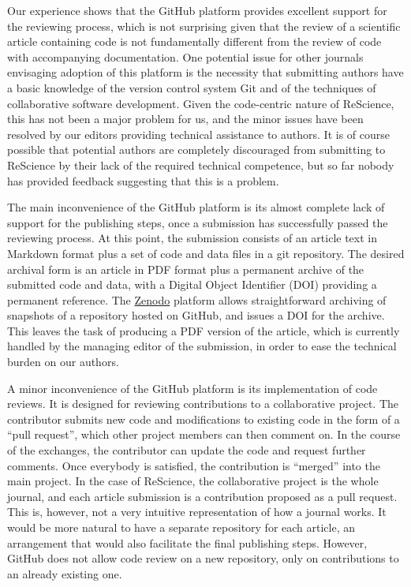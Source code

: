 \documentclass[11pt]{article}
\begin{document}
Our experience shows that the GitHub platform provides excellent
support for the reviewing process, which is not surprising given that the
review of a scientific article containing code is not fundamentally
different from the review of code with accompanying documentation.
One potential issue for other journals envisaging adoption of this
platform is the necessity that submitting authors have a basic
knowledge of the version control system Git and of the techniques of
collaborative software development. Given the code-centric nature of
ReScience, this has not been a major problem for us, and the minor
issues have been resolved by our editors providing technical assistance
to authors. It is of course possible that potential authors are
completely discouraged from submitting to ReScience by their lack
of the required technical competence, but so far nobody has
provided feedback suggesting that this is a problem.

The main inconvenience of the GitHub platform is its almost complete
lack of support for the publishing steps, once a submission has
successfully passed the reviewing process. At this point, the
submission consists of an article text in Markdown format plus a set
of code and data files in a git repository. The desired archival form
is an article in PDF format plus a permanent archive of the submitted
code and data, with a Digital Object Identifier (DOI) providing a
permanent reference. The \href{https://zenodo.org/}{Zenodo} platform
allows straightforward archiving of snapshots of a repository hosted
on GitHub, and issues a DOI for the archive. This leaves the task
of producing a PDF version of the article, which is currently handled
by the managing editor of the submission, in order to ease the technical
burden on our authors.

A minor inconvenience of the GitHub platform is its implementation of
code reviews. It is designed for reviewing contributions to a
collaborative project. The contributor submits new code and
modifications to existing code in the form of a ``pull request'',
which other project members can then comment on. In the course of the
exchanges, the contributor can update the code and request further
comments. Once everybody is satisfied, the contribution is ``merged''
into the main project. In the case of ReScience, the collaborative
project is the whole journal, and each article submission is a
contribution proposed as a pull request. This is, however, not a very
intuitive representation of how a journal works. It would be more
natural to have a separate repository for each article, an arrangement
that would also facilitate the final publishing steps. However, GitHub
does not allow code review on a new repository, only on contributions
to an already existing one.
\end{document}
